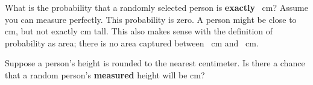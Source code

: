 \begin{examplewrap}
\begin{nexample}{What is the probability that a randomly selected person is \textbf{exactly} ~cm? Assume you can measure perfectly.}
\label{probabilityOfExactly180cm}
This probability is zero. A person might be close to  cm, but not exactly  cm tall. This also makes sense with the definition of probability as area; there is no area captured between ~cm and ~cm.
\end{nexample}
\end{examplewrap}

\begin{exercisewrap}
\begin{nexercise}
Suppose a person's height is rounded to the nearest centimeter. Is there a chance that a random person's \textbf{measured} height will be  cm?\footnotemark
\end{nexercise}
\end{exercisewrap}



{}
